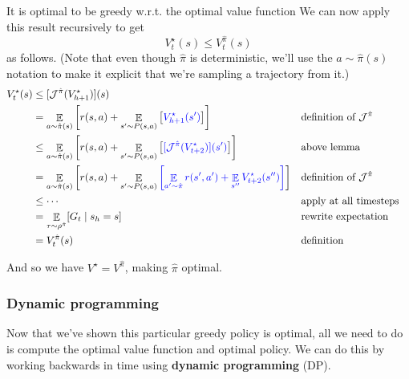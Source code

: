 \documentclass[\main/main]{subfiles}
\begin{document}
\begin{theorem}{It is optimal to be greedy w.r.t. the optimal value function}
    We can now apply this result recursively to get
    \[
    V^{\star}_t(s) \le V^{\hat \pi}_t(s)
    \]
    as follows. (Note that even though $\hat \pi$ is deterministic, we'll use the $a \sim \hat \pi(s)$ notation to make it explicit that we're sampling a trajectory from it.)
    \begin{align*}
    V_{t}^{\star}(s) &\le [\mathcal{J}^{\hat \pi}(V_{h+1}^{\star})](s) \\
    &= \mathop{\mathbb{E}}_{a \sim \hat \pi(s)} \left[ r(s, a) + \mathop{\mathbb{E}}_{s' \sim P(s, a)} \left[ {\color{blue} V_{h+1}^{\star}(s')} \right] \right] && \text{definition of } \mathcal{J}^{\hat \pi} \\
    &\le \mathop{\mathbb{E}}_{a \sim \hat \pi(s)} \left[ r(s, a) + \mathop{\mathbb{E}}_{s' \sim P(s, a)} \left[ {\color{blue}[ \mathcal{J}^{\hat \pi} (V_{t+2}^{\star})] (s')} \right] \right] && \text{above lemma} \\
    &= \mathop{\mathbb{E}}_{a \sim \hat \pi(s)} \left[ r(s, a) + \mathop{\mathbb{E}}_{s' \sim P(s, a)}{\color{blue} \left[ \mathop{\mathbb{E}}_{a' \sim \hat \pi}  r(s', a') + \mathop{\mathbb{E}}_{s''} V_{t+2}^{\star}(s'') \right]} \right] && \text{definition of } \mathcal{J}^{\hat \pi} \\
    &\le \cdots && \text{apply at all timesteps} \\
    &= \mathop{\mathbb{E}}_{\tau \sim \rho^{\hat \pi}} [G_{t} \mid s_h = s] && \text{rewrite expectation} \\
    &= V_{t}^{\hat \pi}(s) && \text{definition}
    \end{align*}

    And so we have $V^{\star} = V^{\hat \pi}$, making $\hat \pi$ optimal.
\end{theorem}


\subsubsection{Dynamic programming}

Now that we've shown this particular greedy policy is optimal, all we need to do is compute the optimal value function and optimal policy. We can do this by working backwards in time using \textbf{dynamic programming} (DP).
\end{document}
